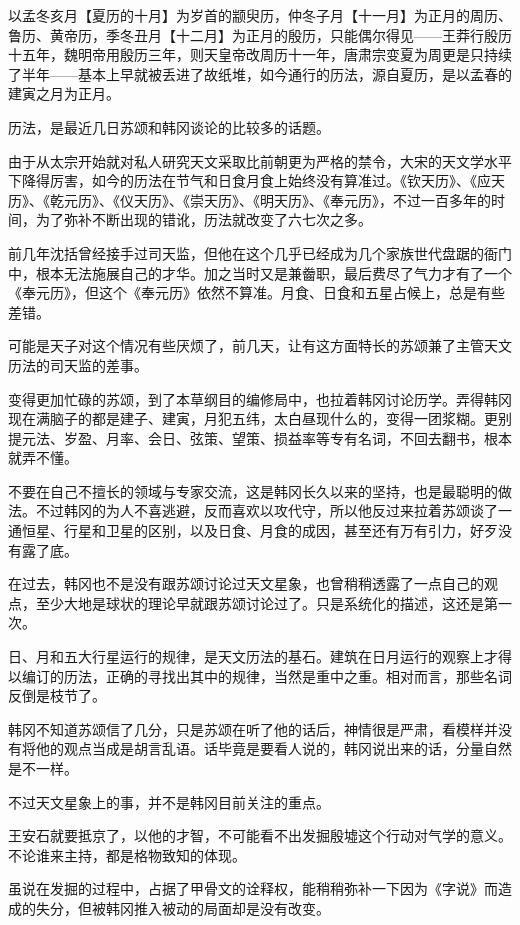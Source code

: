 以孟冬亥月【夏历的十月】为岁首的颛臾历，仲冬子月【十一月】为正月的周历、鲁历、黄帝历，季冬丑月【十二月】为正月的殷历，只能偶尔得见——王莽行殷历十五年，魏明帝用殷历三年，则天皇帝改周历十一年，唐肃宗变夏为周更是只持续了半年——基本上早就被丢进了故纸堆，如今通行的历法，源自夏历，是以孟春的建寅之月为正月。

历法，是最近几日苏颂和韩冈谈论的比较多的话题。

由于从太宗开始就对私人研究天文采取比前朝更为严格的禁令，大宋的天文学水平下降得厉害，如今的历法在节气和日食月食上始终没有算准过。《钦天历》、《应天历》、《乾元历》、《仪天历》、《崇天历》、《明天历》、《奉元历》，不过一百多年的时间，为了弥补不断出现的错讹，历法就改变了六七次之多。

前几年沈括曾经接手过司天监，但他在这个几乎已经成为几个家族世代盘踞的衙门中，根本无法施展自己的才华。加之当时又是兼齤职，最后费尽了气力才有了一个《奉元历》，但这个《奉元历》依然不算准。月食、日食和五星占候上，总是有些差错。

可能是天子对这个情况有些厌烦了，前几天，让有这方面特长的苏颂兼了主管天文历法的司天监的差事。

变得更加忙碌的苏颂，到了本草纲目的编修局中，也拉着韩冈讨论历学。弄得韩冈现在满脑子的都是建子、建寅，月犯五纬，太白昼现什么的，变得一团浆糊。更别提元法、岁盈、月率、会日、弦策、望策、损益率等专有名词，不回去翻书，根本就弄不懂。

不要在自己不擅长的领域与专家交流，这是韩冈长久以来的坚持，也是最聪明的做法。不过韩冈的为人不喜逃避，反而喜欢以攻代守，所以他反过来拉着苏颂谈了一通恒星、行星和卫星的区别，以及日食、月食的成因，甚至还有万有引力，好歹没有露了底。

在过去，韩冈也不是没有跟苏颂讨论过天文星象，也曾稍稍透露了一点自己的观点，至少大地是球状的理论早就跟苏颂讨论过了。只是系统化的描述，这还是第一次。

日、月和五大行星运行的规律，是天文历法的基石。建筑在日月运行的观察上才得以编订的历法，正确的寻找出其中的规律，当然是重中之重。相对而言，那些名词反倒是枝节了。

韩冈不知道苏颂信了几分，只是苏颂在听了他的话后，神情很是严肃，看模样并没有将他的观点当成是胡言乱语。话毕竟是要看人说的，韩冈说出来的话，分量自然是不一样。

不过天文星象上的事，并不是韩冈目前关注的重点。

王安石就要抵京了，以他的才智，不可能看不出发掘殷墟这个行动对气学的意义。不论谁来主持，都是格物致知的体现。

虽说在发掘的过程中，占据了甲骨文的诠释权，能稍稍弥补一下因为《字说》而造成的失分，但被韩冈推入被动的局面却是没有改变。

